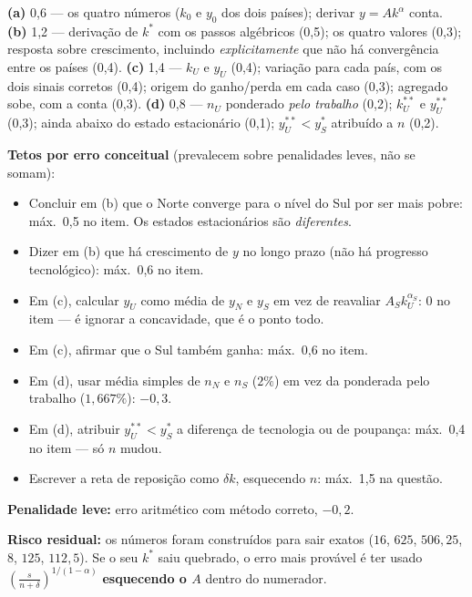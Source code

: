\documentclass[11pt, a4paper]{article}
\newcommand{\stst}{^{\ast}}
\newcommand{\ststst}{^{\ast\ast}}
\begin{document}
\begin{tcolorbox}[rubricbox]
\small
\textbf{(a)} 0,6 --- os quatro números ($k_0$ e $y_0$ dos dois países); derivar
$y = Ak^{\alpha}$ conta.
\textbf{(b)} 1,2 --- derivação de $k\stst$ com os passos algébricos (0,5); os quatro valores
(0,3); resposta sobre crescimento, incluindo \emph{explicitamente} que não há convergência
entre os países (0,4).
\textbf{(c)} 1,4 --- $k_U$ e $y_U$ (0,4); variação para cada país, com os dois sinais
corretos (0,4); origem do ganho/perda em cada caso (0,3); agregado sobe, com a conta (0,3).
\textbf{(d)} 0,8 --- $n_U$ ponderado \emph{pelo trabalho} (0,2); $k\ststst_U$ e
$y\ststst_U$ (0,3); ainda abaixo do estado estacionário (0,1); $y\ststst_U < y\stst_S$
atribuído a $n$ (0,2).

\smallskip
\textbf{Tetos por erro conceitual} (prevalecem sobre penalidades leves, não se somam):
\begin{itemize}[topsep=2pt]
\item Concluir em (b) que o Norte converge para o nível do Sul por ser mais pobre:
      máx.\ 0,5 no item. Os estados estacionários são \emph{diferentes}.
\item Dizer em (b) que há crescimento de $y$ no longo prazo (não há progresso tecnológico):
      máx.\ 0,6 no item.
\item Em (c), calcular $y_U$ como média de $y_N$ e $y_S$ em vez de reavaliar
      $A_S k_U^{\alpha_S}$: 0 no item --- é ignorar a concavidade, que é o ponto todo.
\item Em (c), afirmar que o Sul também ganha: máx.\ 0,6 no item.
\item Em (d), usar média simples de $n_N$ e $n_S$ ($2\%$) em vez da ponderada pelo trabalho
      ($1{,}667\%$): $-0{,}3$.
\item Em (d), atribuir $y\ststst_U < y\stst_S$ a diferença de tecnologia ou de poupança:
      máx.\ 0,4 no item --- só $n$ mudou.
\item Escrever a reta de reposição como $\delta k$, esquecendo $n$: máx.\ 1,5 na questão.
\end{itemize}
\textbf{Penalidade leve:} erro aritmético com método correto, $-0{,}2$.

\smallskip
\textbf{Risco residual:} os números foram construídos para sair exatos
($16$, $625$, $506{,}25$, $8$, $125$, $112{,}5$). Se o seu $k\stst$ saiu quebrado, o erro
mais provável é ter usado $\left(\frac{s}{n+\delta}\right)^{1/(1-\alpha)}$
\textbf{esquecendo o $A$} dentro do numerador.
\end{tcolorbox}
\end{document}
